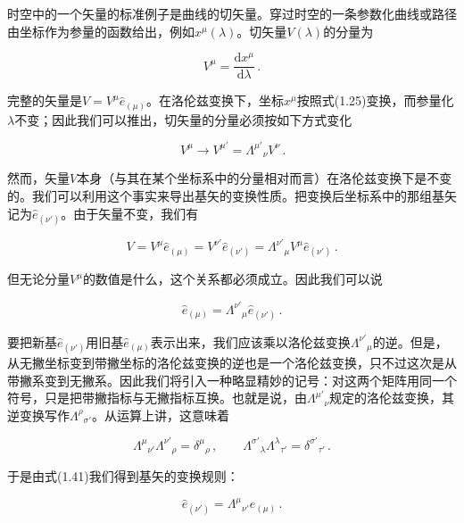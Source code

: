 时空中的一个矢量的标准例子是曲线的切矢量。穿过时空的一条参数化曲线或路径由坐标作为参量的函数给出，例如$x^{\mu}(\lambda)$。切矢量$V(\lambda)$的分量为

\begin{equation*}
V^{\mu}=\frac{\mathrm{d}x^{\mu}}{\mathrm{d}\lambda}\,.
\tag{1.38}
\end{equation*}

完整的矢量是$V=V^{\mu}\hat{e}_{(\mu)}$。在洛伦兹变换下，坐标$x^{\mu}$按照式(1.25)变换，而参量化$\lambda$不变；因此我们可以推出，切矢量的分量必须按如下方式变化

\begin{equation*}
\boxed{\,V^{\mu}\rightarrow V^{\mu'}=\Lambda^{\mu'}{}_{\nu}V^{\nu}\,.}
\tag{1.39}
\end{equation*}

然而，矢量$V$本身（与其在某个坐标系中的分量相对而言）在洛伦兹变换下是不变的。我们可以利用这个事实来导出基矢的变换性质。把变换后坐标系中的那组基矢记为$\hat{e}_{(\nu')}$。由于矢量不变，我们有

\begin{equation*}
V=V^{\mu}\hat{e}_{(\mu)}=V^{\nu'}\hat{e}_{(\nu')}
=\Lambda^{\nu'}{}_{\mu}V^{\mu}\hat{e}_{(\nu')}\,.
\tag{1.40}
\end{equation*}

但无论分量$V^{\mu}$的数值是什么，这个关系都必须成立。因此我们可以说

\begin{equation*}
\hat{e}_{(\mu)}=\Lambda^{\nu'}{}_{\mu}\hat{e}_{(\nu')}\,.
\tag{1.41}
\end{equation*}

要把新基$\hat{e}_{(\nu')}$用旧基$\hat{e}_{(\mu)}$表示出来，我们应该乘以洛伦兹变换$\Lambda^{\nu'}{}_{\mu}$的逆。但是，从无撇坐标变到带撇坐标的洛伦兹变换的逆也是一个洛伦兹变换，只不过这次是从带撇系变到无撇系。因此我们将引入一种略显精妙的记号：对这两个矩阵用同一个符号，只是把带撇指标与无撇指标互换。也就是说，由$\Lambda^{\mu'}{}_{\nu}$规定的洛伦兹变换，其逆变换写作$\Lambda^{\rho}{}_{\sigma'}$。从运算上讲，这意味着

\begin{equation*}
\Lambda^{\mu}{}_{\nu'}\Lambda^{\nu'}{}_{\rho}=\delta^{\mu}{}_{\rho}\,,\qquad
\Lambda^{\sigma'}{}_{\lambda}\Lambda^{\lambda}{}_{\tau'}=\delta^{\sigma'}{}_{\tau'}\,.
\tag{1.42}
\end{equation*}

于是由式(1.41)我们得到基矢的变换规则：

\begin{equation*}
\hat{e}_{(\nu')}=\Lambda^{\mu}{}_{\nu'}\hat{e}_{(\mu)}\,.
\tag{1.43}
\end{equation*}

